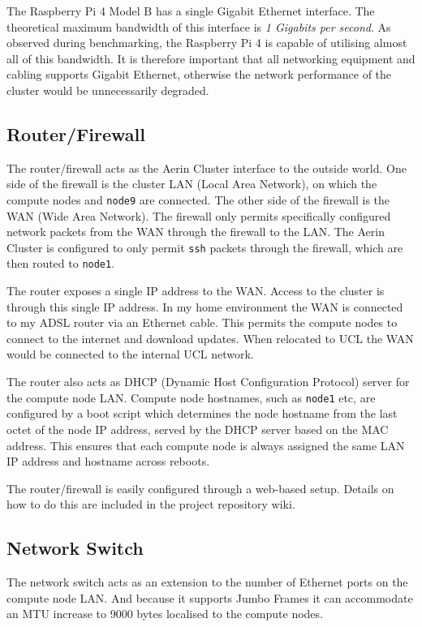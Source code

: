 The Raspberry Pi 4 Model B has a single Gigabit Ethernet interface. The theoretical maximum bandwidth of this interface is \emph{1 Gigabits per second}. As observed during benchmarking, the Raspberry Pi 4 is capable of utilising almost all of this bandwidth. It is therefore important that all networking equipment and cabling supports Gigabit Ethernet, otherwise the network performance of the cluster would be unnecessarily degraded.


%
%
\subsection{Router/Firewall}
The router/firewall acts as the Aerin Cluster interface to the outside world. One side of the firewall is the cluster LAN (Local Area Network), on which the compute nodes and \verb|node9| are connected. The other side of the firewall is the WAN (Wide Area Network). The firewall only permits specifically configured network packets from the WAN through the firewall to the LAN. The Aerin Cluster is configured to only permit \verb|ssh| packets through the firewall, which are then routed to \verb|node1|.

The router exposes a single IP address to the WAN. Access to the cluster is through this single IP address. In my home environment the WAN is connected to my ADSL router via an Ethernet cable. This permits the compute nodes to connect to the internet and download updates. When relocated to UCL the WAN would be connected to the internal UCL network.

The router also acts as DHCP (Dynamic Host Configuration Protocol) server for the compute node LAN. Compute node hostnames, such as \verb|node1| etc, are configured by a boot script which determines the node hostname from the last octet of the node IP address, served by the DHCP server based on the MAC address. This ensures that each compute node is always assigned the same LAN IP address and hostname across reboots.

The router/firewall is easily configured through a web-based setup. Details on how to do this are included in the project repository wiki.


%
%
\subsection{Network Switch}

The network switch acts as an extension to the number of Ethernet ports on the compute node LAN. And because it supports Jumbo Frames it can accommodate an MTU increase to 9000 bytes localised to the compute nodes.


